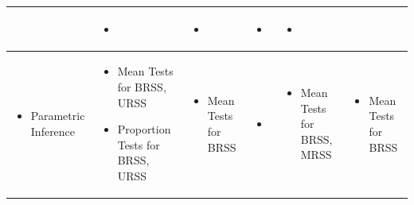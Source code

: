 \begin{table}[!ht]
{\begin{tabular}{p{2.5cm} p{3.3cm} p{3cm} p{3cm} p{3.1cm} p{3cm}}
\begin{itemize}[nosep,after=\strut,leftmargin=*,topsep=0pt,itemsep=0pt,parsep=0pt,partopsep=0pt]
\end{itemize}
& \begin{itemize}[nosep,after=\strut,leftmargin=*]
    \item[--]
\end{itemize} & \begin{itemize}[nosep,after=\strut,leftmargin=*]
    \item[--]
\end{itemize} & \begin{itemize}[nosep,after=\strut,leftmargin=*]
    \item[--]
\end{itemize} & \begin{itemize}[nosep,after=\strut,leftmargin=*]
    \item[--]
\end{itemize} \\ \hline
\begin{itemize}[label={},nosep,leftmargin=*,topsep=0pt]
  \item {Parametric \newline Inference}
\end{itemize} & \begin{itemize}[nosep,after=\strut,leftmargin=*,topsep=0pt,itemsep=0pt,parsep=0pt,partopsep=0pt]
    \item Mean Tests \newline for BRSS, URSS
    \item Proportion Tests \newline for BRSS, URSS
\end{itemize}& \begin{itemize}[nosep,after=\strut,leftmargin=*,topsep=0pt,itemsep=0pt,parsep=0pt,partopsep=0pt]
    \item Mean Tests \newline for BRSS
\end{itemize} & \begin{itemize}[nosep,after=\strut,leftmargin=*]
    \item[--]
\end{itemize} & \begin{itemize}[nosep,after=\strut,leftmargin=*,topsep=0pt,itemsep=0pt,parsep=0pt,partopsep=0pt]
    \item Mean Tests \newline for BRSS, MRSS
\end{itemize} & \begin{itemize}[nosep,after=\strut,leftmargin=*,topsep=0pt,itemsep=0pt,parsep=0pt,partopsep=0pt]
    \item Mean Tests \newline for BRSS

\end{itemize}
\end{tabular}}
\end{table}
